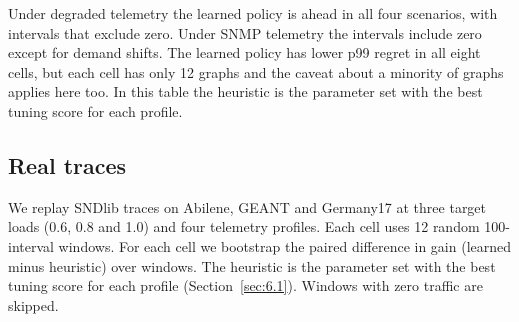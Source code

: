 \documentclass[journal]{IEEEtran}
\begin{document}
\begin{table}[!t]
\caption{Stress scenarios on 12 Zoo graphs. dScore and p99 regret as in Table~\ref{tab:2}; difference is heuristic minus learned with a 95\% bootstrap interval over graphs.}
\label{tab:3}
\centering
\scriptsize
\renewcommand{\arraystretch}{1.05}
\end{table}

Under degraded telemetry the learned policy is ahead in all four scenarios, with intervals that exclude zero. Under SNMP telemetry the intervals include zero except for demand shifts. The learned policy has lower p99 regret in all eight cells, but each cell has only 12 graphs and the caveat about a minority of graphs applies here too. In this table the heuristic is the parameter set with the best tuning score for each profile.

\subsection{Real traces}
\label{sec:6.2}
We replay SNDlib traces on Abilene, GEANT and Germany17 at three target loads (0.6, 0.8 and 1.0) and four telemetry profiles. Each cell uses 12 random 100-interval windows. For each cell we bootstrap the paired difference in gain (learned minus heuristic) over windows. The heuristic is the parameter set with the best tuning score for each profile (Section~\ref{sec:6.1}). Windows with zero traffic are skipped.
\end{document}
